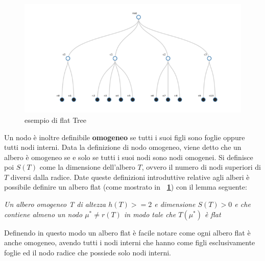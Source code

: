 {\begin{figure}[!htb]
	\begin{center}
		\includegraphics[width=0.8 \linewidth]{figure/flatTree}
	\end{center}
	\caption{esempio di flat Tree \label{fig:flatTree}}
\end{figure}
Un nodo è inoltre definibile \textbf{omogeneo} se tutti i suoi figli sono foglie oppure tutti nodi interni.
Data la definizione di nodo omogeneo, viene detto che un albero è omogeneo se e solo se tutti i suoi nodi sono nodi omogenei.
Si definisce poi $S(T)$ come la dimensione dell'albero $T$, ovvero il numero di nodi superiori di $T$ diversi dalla radice.
Date queste definizioni introduttive relative agli alberi è possibile definire un albero flat (come mostrato in \textbf{\figurename~\ref{fig:flatTree}}) con il lemma seguente:
\begin{center}
	\textit{Un albero omogeneo T di altezza $h(T)>= 2$ e dimensione $S(T)> 0$  e che contiene almeno un nodo $\mu^*\neq r(T)$ in modo tale che $T(\mu^*)$ è flat}
\end{center}
Definendo in questo modo un albero flat è facile notare come ogni albero flat è anche omogeneo, avendo tutti i nodi interni che hanno come figli esclusivamente foglie ed il nodo radice che possiede solo nodi interni.\\
}

